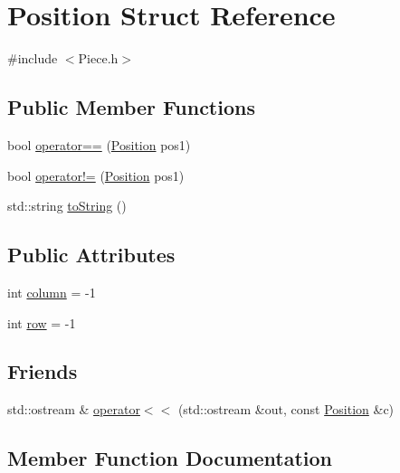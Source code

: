 \hypertarget{struct_position}{}\section{Position Struct Reference}
\label{struct_position}


{\ttfamily \#include $<$Piece.\+h$>$}

\subsection*{Public Member Functions}
\begin{DoxyCompactItemize}
\item 
bool \hyperlink{struct_position_a9a4a985957583381b09f874b86b8fa21}{operator==} (\hyperlink{struct_position}{Position} pos1)
\item 
bool \hyperlink{struct_position_ad646756877878bff8246b1317dc15650}{operator!=} (\hyperlink{struct_position}{Position} pos1)
\item 
std\+::string \hyperlink{struct_position_a7940e4c278d50b49fa47c540665a3586}{to\+String} ()
\end{DoxyCompactItemize}
\subsection*{Public Attributes}
\begin{DoxyCompactItemize}
\item 
int \hyperlink{struct_position_a7bf46f67257b7fd5d6ced23095d15846}{column} = -\/1
\item 
int \hyperlink{struct_position_a224d714110152e1fca26b2437253f56a}{row} = -\/1
\end{DoxyCompactItemize}
\subsection*{Friends}
\begin{DoxyCompactItemize}
\item 
std\+::ostream \& \hyperlink{struct_position_a86474d9635197acafd2a0aeca048e2d1}{operator$<$$<$} (std\+::ostream \&out, const \hyperlink{struct_position}{Position} \&c)
\end{DoxyCompactItemize}


\subsection{Member Function Documentation}
\mbox{\label{struct_position_ad646756877878bff8246b1317dc15650}} 
